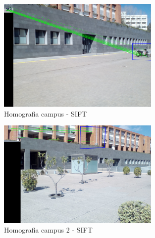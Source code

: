 		\begin{figure}[H]
			\centering
			\includegraphics[width=0.7\textwidth]{images/uniSel}
			\caption{Homografia campus - SIFT}
		\end{figure}
		\begin{figure}[H]
			\centering
			\includegraphics[width=0.7\textwidth]{images/uniSel5}
			\caption{Homografia campus 2 - SIFT}
		\end{figure}
